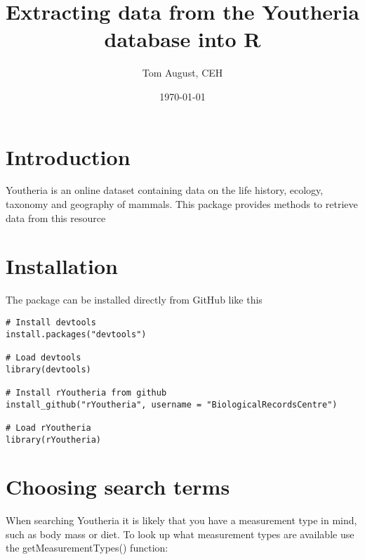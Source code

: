 \documentclass[a4paper]{article}\usepackage[]{graphicx}\usepackage[]{color}
\begin{document}
\title{Extracting data from the Youtheria database into R}
\author{Tom August, CEH}
\date\today
\maketitle
\section{Introduction}
Youtheria is an online dataset containing data on the life history, ecology, taxonomy and geography of mammals. This package provides methods to retrieve data from this resource

\section{Installation}
The package can be installed directly from GitHub like this

\begin{verbatim}
# Install devtools
install.packages("devtools")

# Load devtools
library(devtools)

# Install rYoutheria from github
install_github("rYoutheria", username = "BiologicalRecordsCentre")

# Load rYoutheria
library(rYoutheria)
\end{verbatim}

\section{Choosing search terms}
When searching Youtheria it is likely that you have a measurement type in mind, such as body mass or diet. To look up what measurement types are available use the getMeasurementTypes() function:
\end{document}
